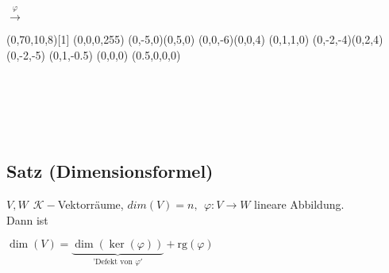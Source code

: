 \documentclass[a4paper, 12pt,titlepage, pdf, headsepline]{article}
\newcommand{\R}{\mathds{R}}
\newcommand{\K}{\mathcal{K}}
\newcommand{\rg}{\textrm{rg}}
\renewcommand{\>}{\rightarrow}
\renewcommand{\*}{\cdot}
\renewcommand{\phi}{\varphi}
\begin{document}
		      			\begin{minipage}[c]{0.15\textwidth}~\\
		      				~\\
		      				~\\
		      				~\\
		      				~\\
		      				~\\
		      				\centering	$\overset{\phi}{\longrightarrow}$
		      			\end{minipage}
		      			\begin{minipage}[c]{0.425\textwidth}
		      				\Viewpoint(0,70,10,8)[1]
		      				\SetCMYKColor(0,0,0,255)
		      				\SetNormal
		      				\DDArrowAt(0,-5,0)(0,5,0)
		      				\DDArrowAt(0,0,-6)(0,0,4)
		      				\Text[r]{$y~~~~~~~~~~~~~~~~~~~~~\R^2$}
		      				\SetCMYKColor(0,1,1,0)
		      				\DDArrowAt(0,-2,-4)(0,2,4)
		      				\Text[b]{$\phi(\R^3)$}
		      				\DDMoveTo(0,-2,-5)
		      				\Text[c]{$\phi(\langle v\rangle)$}
		      				\DDMoveTo(0,1,-0.5)
		      				\Text[c]{$\ker(\phi)$}
		      				\DDMoveTo(0,0,0)
		      				\SetCMYKColor(0.5,0,0,0)
		      				\BigPoint
		      				\CloseGraph
		      			\end{minipage}\\
		      			\\
		      			\\
		      			\\
		      			\subsection{Satz (Dimensionsformel)}
		      			\label{6.14}
		      			$V,W ~~\K-$Vektorräume, $dim(V) = n,~~ \phi: V \rightarrow W$ lineare Abbildung.\\
		      			Dann ist 
		      			\begin{center}
                                                $\dim(V)= \underbrace{\dim(\ker(\phi))}_{\text{'Defekt von }\phi'} + \rg(\phi)$
		      			\end{center}
\end{document}

